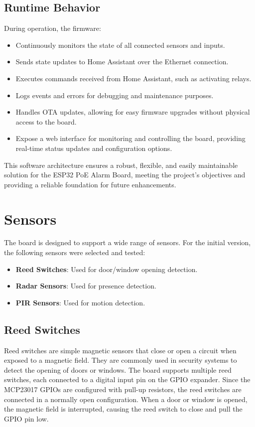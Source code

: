 \documentclass[a4paper,12pt]{article}
\begin{document}
\subsection{Runtime Behavior}
During operation, the firmware:
\begin{itemize}
    \item Continuously monitors the state of all connected sensors and inputs.
    \item Sends state updates to Home Assistant over the Ethernet connection.
    \item Executes commands received from Home Assistant, such as activating relays.
    \item Logs events and errors for debugging and maintenance purposes.
    \item Handles OTA updates, allowing for easy firmware upgrades without physical access to the board.
    \item Expose a web interface for monitoring and controlling the board, providing real-time status updates and configuration options.
\end{itemize}

This software architecture ensures a robust, flexible, and easily maintainable solution for the ESP32 PoE Alarm Board, meeting the project's objectives and providing a reliable foundation for future enhancements.

\newpage
\section{Sensors}
The board is designed to support a wide range of sensors. For the initial version, the following sensors were selected and tested:
\begin{itemize}
    \item \textbf{Reed Switches}: Used for door/window opening detection.
    \item \textbf{Radar Sensors}: Used for presence detection.
    \item \textbf{PIR Sensors}: Used for motion detection.
\end{itemize}

\subsection{Reed Switches}
Reed switches are simple magnetic sensors that close or open a circuit when exposed to a magnetic field. They are commonly used in security systems to detect the opening of doors or windows. The board supports multiple reed switches, each connected to a digital input pin on the GPIO expander. Since the MCP23017 GPIOs are configured with pull-up resistors, the reed switches are connected in a normally open configuration. When a door or window is opened, the magnetic field is interrupted, causing the reed switch to close and pull the GPIO pin low.
\end{document}

